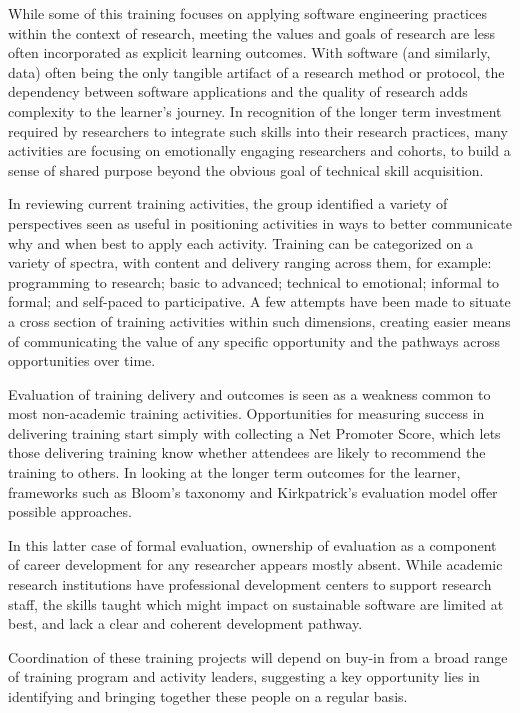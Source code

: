 While some of this training focuses on applying software engineering practices
within the context of research, meeting the values and goals of research are
less often incorporated as explicit learning outcomes. With software (and
similarly, data) often being the only tangible artifact of a research method or
protocol, the dependency between software applications and the quality of
research adds complexity to the learner's journey. In recognition of the longer
term investment required by researchers to integrate such skills into their
research practices, many activities are focusing on emotionally engaging
researchers and cohorts, to build a sense of shared purpose beyond the obvious
goal of technical skill acquisition.

In reviewing current training activities, the group identified a variety of
perspectives seen as useful in positioning activities in ways to better
communicate why and when best to apply each activity. Training can be
categorized on a variety of spectra, with content and delivery ranging across them, for example:
programming to research; basic to advanced; technical to emotional; informal to
formal; and self-paced to participative. A few attempts have been made to situate a
cross section of training activities within such dimensions, creating easier
means of communicating the value of any specific opportunity and the pathways
across opportunities over time.

Evaluation of training delivery and outcomes is seen as a weakness common to
most non-academic training activities. Opportunities for measuring success in
delivering training start simply with collecting a Net Promoter Score, which
lets those delivering training know whether attendees are likely to recommend
the training to others. In looking at the longer term outcomes for the learner,
frameworks such as Bloom's taxonomy and Kirkpatrick's evaluation model offer possible
approaches.

In this latter case of formal evaluation, ownership of evaluation as a component
of career development for any researcher appears mostly absent. While academic
research institutions have professional development centers to support research
staff, the skills taught which might impact on sustainable software are limited
at best, and lack a clear and coherent development pathway.

Coordination of these training projects will depend on buy-in from a broad range
of training program and activity leaders, suggesting a key opportunity lies in
identifying and bringing together these people on a regular basis.

